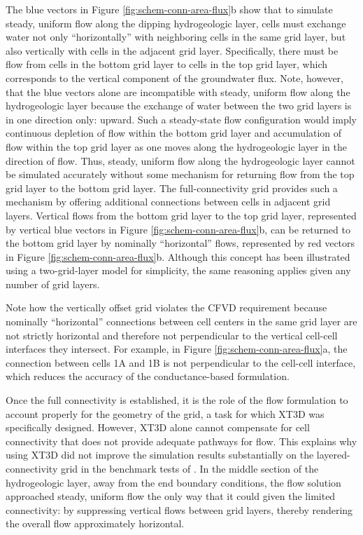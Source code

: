 \documentclass{article}
\begin{document}
The blue vectors in Figure \ref{fig:schem-conn-area-flux}b show that to simulate steady, uniform flow along the dipping hydrogeologic layer, cells must exchange water not only ``horizontally'' with neighboring cells in the same grid layer, but also vertically with cells in the adjacent grid layer. Specifically, there must be flow from cells in the bottom grid layer to cells in the top grid layer, which corresponds to the vertical component of the groundwater flux. Note, however, that the blue vectors alone are incompatible with steady, uniform flow along the hydrogeologic layer because the exchange of water between the two grid layers is in one direction only: upward. Such a steady-state flow configuration would imply continuous depletion of flow within the bottom grid layer and accumulation of flow within the top grid layer as one moves along the hydrogeologic layer in the direction of flow. Thus, steady, uniform flow along the hydrogeologic layer cannot be simulated accurately without some mechanism for returning flow from the top grid layer to the bottom grid layer. The full-connectivity grid provides such a mechanism by offering additional connections between cells in adjacent grid layers. Vertical flows from the bottom grid layer to the top grid layer, represented by vertical blue vectors in Figure \ref{fig:schem-conn-area-flux}b, can be returned to the bottom grid layer by nominally ``horizontal'' flows, represented by red vectors in Figure \ref{fig:schem-conn-area-flux}b. Although this concept has been illustrated using a two-grid-layer model for simplicity, the same reasoning applies given any number of grid layers.

Note how the vertically offset grid violates the CFVD requirement because nominally ``horizontal'' connections between cell centers in the same grid layer are not strictly horizontal and therefore not perpendicular to the vertical cell-cell interfaces they intersect. For example, in Figure \ref{fig:schem-conn-area-flux}a, the connection between cells 1A and 1B is not perpendicular to the cell-cell interface, which reduces the accuracy of the conductance-based formulation.

Once the full connectivity is established, it is the role of the flow formulation to account properly for the geometry of the grid, a task for which XT3D was specifically designed. However, XT3D alone cannot compensate for cell connectivity that does not provide adequate pathways for flow. This explains why using XT3D did not improve the simulation results substantially on the layered-connectivity grid in the benchmark tests of \cite{bardot2022}.  In the middle section of the hydrogeologic layer, away from the end boundary conditions, the flow solution approached steady, uniform flow the only way that it could given the limited connectivity: by suppressing vertical flows between grid layers, thereby rendering the overall flow approximately horizontal.
\end{document}
